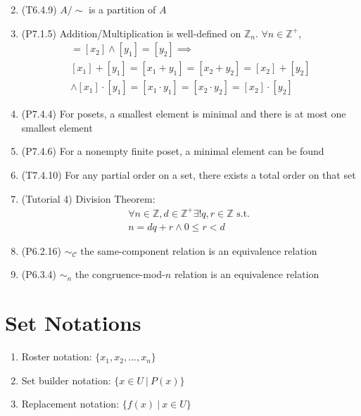 \documentclass[landscape, a4paper]{article}
\newcommand{\Z}{\mathbb{Z}}
\newcommand{\C}{\mathscr{C}}
\renewcommand{\and}{\wedge}
\newcommand{\customsection}[1]{%
    \vspace*{-16pt}%
    \section*{#1}%
    \vspace*{-5pt}%
}
\begin{document}
\begin{multicols*}{4}
\begin{enumerate}[wide, labelindent=2pt]
\[              \]
        \item (T6.4.9) $A/{\sim}$ is a partition of $A$
        \item (P7.1.5) Addition/Multiplication is well-defined on $\Z_n$. $\forall n\in\Z^+$,
              \begin{multline*}
                  [x_1]=[x_2] \and [y_1]=[y_2] \implies \\
                  [x_1]+[y_1]=[x_1+y_1]=[x_2+y_2]=[x_2]+[y_2] \\
                  \and [x_1]\cdot [y_1]=[x_1\cdot y_1]=[x_2\cdot y_2]=[x_2]\cdot [y_2]
              \end{multline*}
        \item (P7.4.4) For posets, a smallest element is minimal and there is at most one smallest element
        \item (P7.4.6) For a nonempty finite poset, a minimal element can be found
        \item (T7.4.10) For any partial order on a set, there exists a total order on that set
        \item (Tutorial 4) Division Theorem:
              \begin{multline*}
                  \forall n\in\Z, d\in\Z^+ \exists !q,r\in\Z \text{ s.t. } \\
                  n=dq+r \and 0\leq r < d
              \end{multline*}
        \item (P6.2.16) ${\sim}_\C$ the same-component relation is an equivalence relation
        \item (P6.3.4) ${\sim}_n$ the congruence-mod-$n$ relation is an equivalence relation

    \end{enumerate}

    \customsection{Set Notations}
    \begin{enumerate}[wide, labelindent=2pt]
        \item Roster notation: $\{x_1, x_2, ..., x_n\}$
        \item Set builder notation: $\{x\in U\ |\ P(x)\}$
        \item Replacement notation: $\{f(x)\ |\ x\in U\}$
    \end{enumerate}


\end{multicols*}
\end{document}
